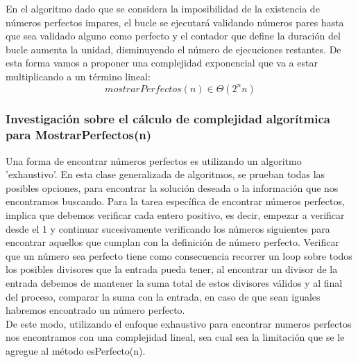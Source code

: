 \documentclass{report}
\begin{document}
            En el algoritmo dado que se considera la imposibilidad de la existencia de números perfectos impares, el bucle se ejecutará validando números pares hasta que sea validado alguno como perfecto y el contador que define la duración del bucle aumenta la unidad, disminuyendo el número de ejecuciones restantes.
            De esta forma vamos a proponer una complejidad exponencial que va a estar multiplicando a un término lineal:
            $$ mostrarPerfectos(n) \in \Theta (2^n n) $$
        \subsubsection*{Investigación sobre el cálculo de complejidad algorítmica para MostrarPerfectos(n)}
        Una forma de encontrar números perfectos es utilizando un algoritmo 'exhaustivo'. En esta clase generalizada de algoritmos, se prueban todas las posibles opciones, para encontrar la solución deseada o la información que nos encontramos buscando. Para la tarea específica de encontrar números perfectos, implica que debemos verificar cada entero positivo, es decir, empezar a verificar desde el 1 y continuar sucesivamente verificando los números siguientes para encontrar aquellos que cumplan con la definición de número perfecto. Verificar que un número sea perfecto tiene como consecuencia recorrer un loop sobre todos los posibles divisores que la entrada pueda tener, al encontrar un divisor de la entrada debemos de mantener la suma total de estos divisores válidos y al final del proceso, comparar la suma con la entrada, en caso de que sean iguales habremos encontrado un número perfecto.\\
        
        De este modo, utilizando el enfoque exhaustivo para encontrar numeros perfectos nos encontramos con una complejidad lineal, sea cual sea la limitación que se le agregue al método esPerfecto(n).\\
        
\end{document}
